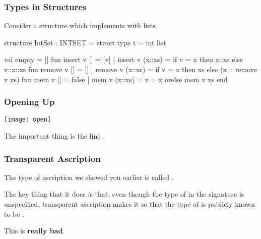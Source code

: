 \documentclass[aspectratio=169]{beamer}
\begin{document}
\begin{frame}[fragile]
  \frametitle{Types in Structures}

  Consider a structure which implements  with lists. 

  \small
  \begin{codeblock}
    structure IntSet : INTSET =
      struct
        type t = int list

        val empty = []
        fun insert v [] = [v]
          | insert v (x::xs) = 
              if v = x then x::xs
              else v::x::xs
        fun remove v [] = []
          | remove v (x::xs) = 
              if v = x then xs else (x :: remove v xs)
        fun mem v [] = false
          | mem v (x::xs) = v = x orelse mem v xs
      end 
  \end{codeblock}
\end{frame}

\begin{frame}[fragile]
  \frametitle{Opening Up}

  \begin{center}
    \texttt{[image: open]}
  \end{center}


  \vspace{\fill}

  The important thing is the line .
\end{frame}

\begin{frame}[fragile]
  \frametitle{Transparent Ascription}

  The type of ascription we showed you earlier is called .

  \vspace{\fill}
  
  The key thing that it does is that, even though the type of  in the
  signature  is unspecified, transparent ascription makes it so that
  the type of  is publicly known to be .

  \vspace{\fill}

  This is \textbf{really bad}.
\end{frame}
\end{document}
